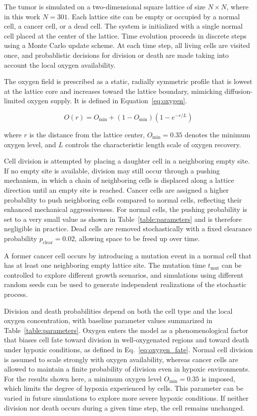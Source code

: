 \documentclass[11pt,a4paper,twoside]{article}
\begin{document}
The tumor is simulated on a two-dimensional square lattice of size $N \times N$, where in this work $N=301$. 
Each lattice site can be empty or occupied by a normal cell, a cancer cell, or a dead cell. The system is 
initialized with a single normal cell placed at the center of the lattice. Time evolution proceeds in discrete 
steps using a Monte Carlo update scheme. At each time step, all living cells are visited once,
and probablistic decisions for division or death are made taking into account the local oxygen availability.


The oxygen field is prescribed as a static, radially symmetric profile that is lowest at the lattice core and
increases toward the lattice boundary, mimicking diffusion-limited oxygen supply. It is defined in Equation~\eqref{eq:oxygen}.

\begin{equation}
O(r) = O_{\min} + \left(1 - O_{\min}\right)\left(1 - e^{-r/L}\right)
\label{eq:oxygen}
\end{equation}

where $r$ is the distance from the lattice center, $O_{\min} = 0.35$ denotes the minimum oxygen level, and $L$ controls
the characteristic length scale of oxygen recovery.

Cell division is attempted by placing a daughter cell in a neighboring empty site. If no empty site is available,
division may still occur through a pushing mechanism, in which a chain of neighboring cells is displaced along 
a lattice direction until an empty site is reached. Cancer cells are assigned a higher probability to push neighboring
cells compared to normal cells, reflecting their enhanced mechanical aggressiveness. For normal cells, the pushing
probability is set to a very small value as shown in Table~\ref{table:parameters} and is therefore negligible in practice. 
Dead cells are removed stochastically with a fixed clearance probability $p_{\text{clear}} = 0.02$, allowing space to be freed up over time.

A former cancer cell occurs by introducing a mutation event in a normal cell that has at least one neighboring empty lattice site. 
The mutation time $t_{\text{mut}}$ can be controlled to explore different growth scenarios, and simulations 
using different random seeds can be used to generate independent realizations of the stochastic process.

Division and death probabilities depend on both the cell type and the local oxygen concentration, with baseline
parameter values summarized in Table~\ref{table:parameters}. Oxygen enters the model as a phenomenological factor 
that biases cell fate toward division in well-oxygenated regions and toward death under hypoxic conditions, as defined in Eq.~\eqref{eq:oxygen_fate}.
Normal cell division is assumed to scale strongly with oxygen availability, whereas cancer cells are allowed
to maintain a finite probability of division even in hypoxic environments. For the results shown here, a minimum oxygen level 
$O_{\min} = 0.35 $ is imposed, which limits the degree of hypoxia experienced by cells. 
This parameter can be varied in future simulations to explore more severe hypoxic conditions.
If neither division nor death occurs during a given time step, the cell remains unchanged.
\end{document}
